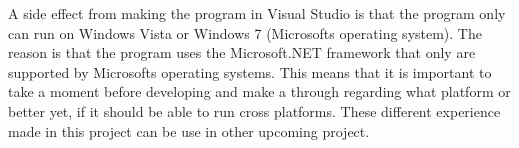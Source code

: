A side effect from making the program in Visual Studio is that the program only can run on Windows Vista or Windows 7 (Microsofts operating system). The reason is that the program uses the Microsoft.NET framework that only are supported by Microsofts operating systems.
This means that it is important to take a moment before developing and make a through regarding what platform or better yet, if it should be able to run cross platforms.
These different experience made in this project can be use in other upcoming project.